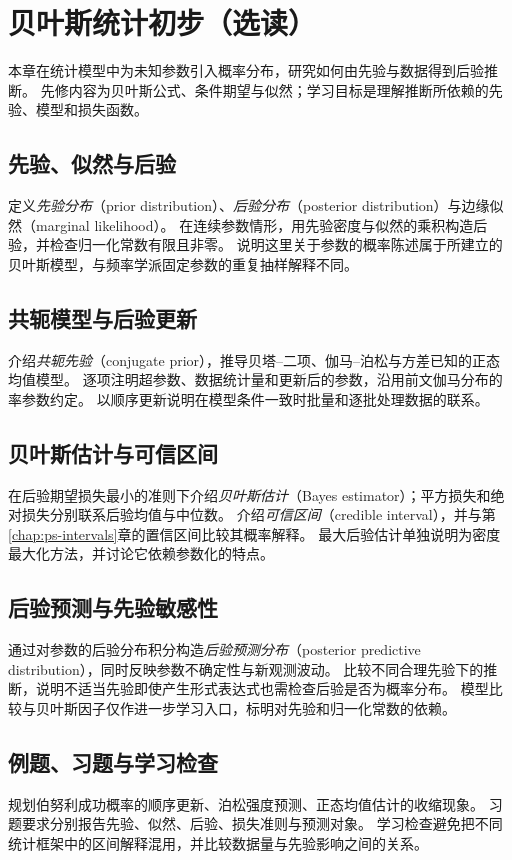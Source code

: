 \setcounter{chapter}{17} %
\chapter{贝叶斯统计初步（选读）}
\label{chap:ps-bayesian}

本章在统计模型中为未知参数引入概率分布，研究如何由先验与数据得到后验推断。
先修内容为贝叶斯公式、条件期望与似然；学习目标是理解推断所依赖的先验、模型和损失函数。

\section{先验、似然与后验}
\label{sec:ps-bayesian-model}
定义\emph{先验分布}（prior distribution）、\emph{后验分布}（posterior distribution）与边缘似然（marginal likelihood）。
在连续参数情形，用先验密度与似然的乘积构造后验，并检查归一化常数有限且非零。
说明这里关于参数的概率陈述属于所建立的贝叶斯模型，与频率学派固定参数的重复抽样解释不同。

\section{共轭模型与后验更新}
\label{sec:ps-conjugate-priors}
介绍\emph{共轭先验}（conjugate prior），推导贝塔--二项、伽马--泊松与方差已知的正态均值模型。
逐项注明超参数、数据统计量和更新后的参数，沿用前文伽马分布的率参数约定。
以顺序更新说明在模型条件一致时批量和逐批处理数据的联系。

\section{贝叶斯估计与可信区间}
\label{sec:ps-bayesian-decisions}
在后验期望损失最小的准则下介绍\emph{贝叶斯估计}（Bayes estimator）；平方损失和绝对损失分别联系后验均值与中位数。
介绍\emph{可信区间}（credible interval），并与第\ref{chap:ps-intervals}章的置信区间比较其概率解释。
最大后验估计单独说明为密度最大化方法，并讨论它依赖参数化的特点。

\section{后验预测与先验敏感性}
\label{sec:ps-posterior-predictive}
通过对参数的后验分布积分构造\emph{后验预测分布}（posterior predictive distribution），同时反映参数不确定性与新观测波动。
比较不同合理先验下的推断，说明不适当先验即使产生形式表达式也需检查后验是否为概率分布。
模型比较与贝叶斯因子仅作进一步学习入口，标明对先验和归一化常数的依赖。

\section{例题、习题与学习检查}
规划伯努利成功概率的顺序更新、泊松强度预测、正态均值估计的收缩现象。
习题要求分别报告先验、似然、后验、损失准则与预测对象。
学习检查避免把不同统计框架中的区间解释混用，并比较数据量与先验影响之间的关系。






